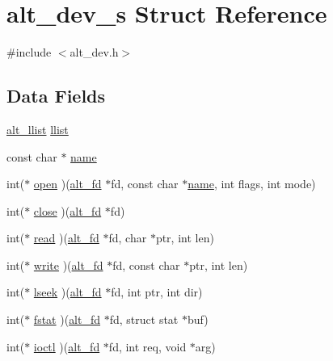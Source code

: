 \hypertarget{structalt__dev__s}{\section{alt\-\_\-dev\-\_\-s \-Struct \-Reference}
\label{structalt__dev__s}
}


{\ttfamily \#include $<$alt\-\_\-dev.\-h$>$}

\subsection*{\-Data \-Fields}
\begin{DoxyCompactItemize}
\item 
\hyperlink{alt__llist_8h_a94b50b44e6bd512a432af0b840d49aa4}{alt\-\_\-llist} \hyperlink{structalt__dev__s_a135bc0be285afc59289210771ad9c136}{llist}
\item 
const char $\ast$ \hyperlink{structalt__dev__s_a8f8f80d37794cde9472343e4487ba3eb}{name}
\item 
int($\ast$ \hyperlink{structalt__dev__s_afedc84b0c25763ecb200e2fdf6b3919a}{open} )(\hyperlink{alt__dev_8h_afdb772b397fcbb083de113d64b859673}{alt\-\_\-fd} $\ast$fd, const char $\ast$\hyperlink{structalt__dev__s_a8f8f80d37794cde9472343e4487ba3eb}{name}, int flags, int mode)
\item 
int($\ast$ \hyperlink{structalt__dev__s_a971c646055e5b97090e1257789d40e04}{close} )(\hyperlink{alt__dev_8h_afdb772b397fcbb083de113d64b859673}{alt\-\_\-fd} $\ast$fd)
\item 
int($\ast$ \hyperlink{structalt__dev__s_a6343e4469a0a96fe7dffde448bdca372}{read} )(\hyperlink{alt__dev_8h_afdb772b397fcbb083de113d64b859673}{alt\-\_\-fd} $\ast$fd, char $\ast$ptr, int len)
\item 
int($\ast$ \hyperlink{structalt__dev__s_a9abad625f9dea6bbf3aa495678ccd894}{write} )(\hyperlink{alt__dev_8h_afdb772b397fcbb083de113d64b859673}{alt\-\_\-fd} $\ast$fd, const char $\ast$ptr, int len)
\item 
int($\ast$ \hyperlink{structalt__dev__s_ab8596a7b90d3cf8e637abbe23825c9bc}{lseek} )(\hyperlink{alt__dev_8h_afdb772b397fcbb083de113d64b859673}{alt\-\_\-fd} $\ast$fd, int ptr, int dir)
\item 
int($\ast$ \hyperlink{structalt__dev__s_a6dd1e33034db23119fcb7b72c43f7b00}{fstat} )(\hyperlink{alt__dev_8h_afdb772b397fcbb083de113d64b859673}{alt\-\_\-fd} $\ast$fd, struct stat $\ast$buf)
\item 
int($\ast$ \hyperlink{structalt__dev__s_a85a75658ee2ebbe698566e4fa8a5ca47}{ioctl} )(\hyperlink{alt__dev_8h_afdb772b397fcbb083de113d64b859673}{alt\-\_\-fd} $\ast$fd, int req, void $\ast$arg)
\end{DoxyCompactItemize}



